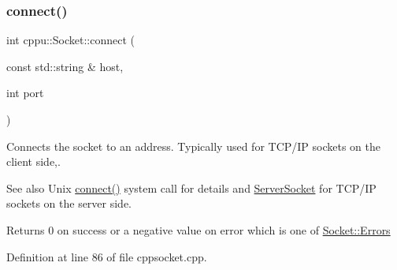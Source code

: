 \begin{DoxyCode}{0}

\end{DoxyCode}
\mbox{\label{classcppu_1_1_socket_af6db3840caee709738f0e2a9ff814e5d}} 
\subsubsection{\texorpdfstring{connect()}{connect()}}
{\footnotesize\ttfamily int cppu\+::\+Socket\+::connect (\begin{DoxyParamCaption}\item[{const std\+::string \&}]{host,  }\item[{int}]{port }\end{DoxyParamCaption})\hspace{0.3cm}{\ttfamily [virtual]}}



Connects the socket to an address. Typically used for T\+C\+P/\+IP sockets on the client side,. 

\begin{DoxySeeAlso}{See also}
Unix \mbox{\hyperlink{classcppu_1_1_socket_af6db3840caee709738f0e2a9ff814e5d}{connect()}} system call for details and \mbox{\hyperlink{classcppu_1_1_server_socket}{Server\+Socket}} for T\+C\+P/\+IP sockets on the server side. 
\end{DoxySeeAlso}
\begin{DoxyReturn}{Returns}
0 on success or a negative value on error which is one of \mbox{\hyperlink{classcppu_1_1_socket_a49ea5cb079bd7ae97ecf7eb30c9d9e5f}{Socket\+::\+Errors}} 
\end{DoxyReturn}


Definition at line 86 of file cppsocket.\+cpp.



